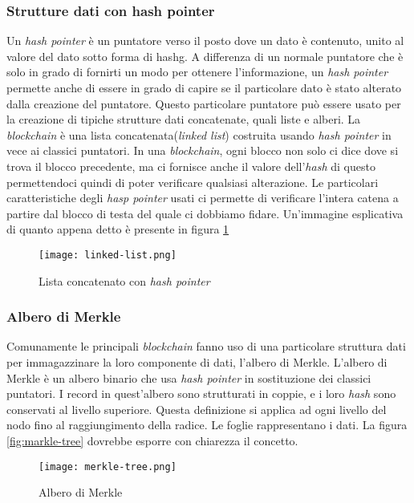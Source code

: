 \subsubsection{Strutture dati con hash pointer}
Un \emph{hash pointer} è un puntatore verso il posto dove un dato è contenuto, unito al valore del dato sotto forma di \gls{hashg}. A differenza di un normale puntatore che è solo in grado di fornirti un modo per ottenere l'informazione, un \emph{hash pointer} permette anche di essere in grado di capire se il particolare dato è stato alterato dalla creazione del puntatore. Questo particolare puntatore può essere usato per la creazione di tipiche strutture dati concatenate, quali liste e alberi. La \emph{blockchain} è una lista concatenata(\emph{linked list}) costruita usando \emph{hash pointer} in vece ai classici puntatori. In una \emph{blockchain}, ogni blocco non solo ci dice dove si trova il blocco precedente, ma ci fornisce anche il valore dell'\textit{hash} di questo permettendoci quindi di poter verificare qualsiasi alterazione. Le particolari caratteristiche degli \emph{hasp pointer} usati ci permette di verificare l'intera catena a partire dal blocco di testa del quale ci dobbiamo fidare. 
Un'immagine esplicativa di quanto appena detto è presente in figura \ref{fig:linked-list}

\begin{figure}[!h]
    \centering
    \texttt{[image: linked-list.png]}
    \caption{Lista concatenato con \emph{hash pointer}}
    \label{fig:linked-list} 
\end{figure}

\subsubsection{Albero di Merkle}
Comunamente le principali \emph{blockchain} fanno uso di una particolare struttura dati per immagazzinare la loro componente di dati, l'albero di Merkle. L'albero di Merkle è un albero binario che usa \emph{hash pointer} in sostituzione dei classici puntatori. I record in quest'albero sono strutturati in coppie, e i loro \emph{hash} sono conservati al livello superiore. Questa definizione si applica ad ogni livello del nodo fino al raggiungimento della radice. Le foglie rappresentano i dati. La figura \ref{fig:markle-tree} dovrebbe esporre con chiarezza il concetto.

\begin{figure}[!h]
    \centering
    \texttt{[image: merkle-tree.png]}
    \caption{Albero di Merkle}
    \label{fig:merkle-tree} 
\end{figure}

